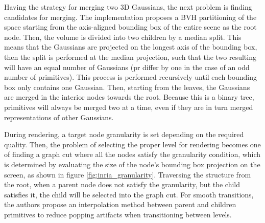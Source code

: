 Having the strategy for merging two 3D Gaussians, the next problem is finding candidates for merging. The implementation proposes a BVH partitioning of the space starting from the axis-aligned bounding box of the entire scene as the root node. Then, the volume is divided into two children by a median split. This means that the Gaussians are projected on the longest axis of the bounding box, then the split is performed at the median projection, such that the two resulting will have an equal number of Gaussians (pr differ by one in the case of an odd number of primitives). This process is performed recursively until each bounding box only contains one Gaussian. Then, starting from the leaves, the Gaussians are merged in the interior nodes towards the root. Because this is a binary tree, primitives will always be merged two at a time, even if they are in turn merged representations of other Gaussians.

During rendering, a target node granularity is set depending on the required quality. Then, the problem of selecting the proper level for rendering becomes one of finding a graph cut where all the nodes satisfy the granularity condition, which is determined by evaluating the size of the node's bounding box projection on the screen, as shown in figure \ref{fig:inria_granularity}. Traversing the structure from the root, when a parent node does not satisfy the granularity, but the child satisfies it, the child will be selected into the graph cut. For smooth transitions, the authors propose an interpolation method between parent and children primitives to reduce popping artifacts when transitioning between levels.

